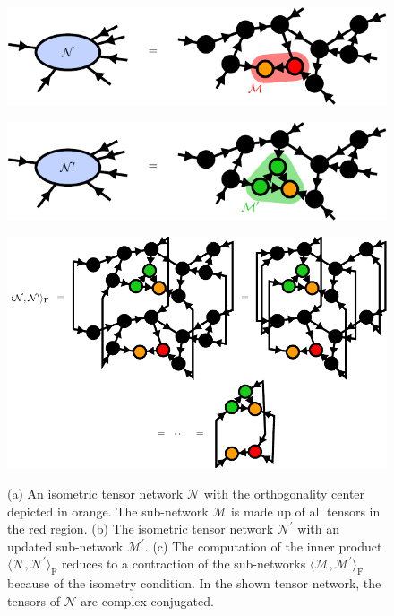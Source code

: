 \begin{figure}
	\centering
	\subcaptionbox{\label{fig:isometric_tensor_network_N}}
	{%
		\includegraphics[scale=1]{figures/tikz/Tensor_Networks/contractions_of_isometric_tensor_networks/contractions_of_isometric_tensor_networks_a.pdf}
	}
	\par\bigskip
	\subcaptionbox{\label{fig:isometric_tensor_network_N_prime}}
	{%
		\includegraphics[scale=1]{figures/tikz/Tensor_Networks/contractions_of_isometric_tensor_networks/contractions_of_isometric_tensor_networks_b.pdf}
	}
	\par\bigskip
	\subcaptionbox{\label{fig:isometric_tensor_network_norm_contraction}}
	{%
		\includegraphics[scale=1]{figures/tikz/Tensor_Networks/contractions_of_isometric_tensor_networks/contractions_of_isometric_tensor_networks_c.pdf}
	}
	\caption{(a) An isometric tensor network $\mathcal{N}$ with the orthogonality center depicted in orange. The sub-network $\mathcal{M}$ is made up of all tensors in the red region. (b) The isometric tensor network $\mathcal{N}^\prime$ with an updated sub-network $\mathcal{M}^\prime$. (c) The computation of the inner product $\langle\mathcal{N},\mathcal{N}^\prime\rangle_\text{F}$ reduces to a contraction of the sub-networks $\langle\mathcal{M},\mathcal{M}^\prime\rangle_\text{F}$ because of the isometry condition. In the shown tensor network, the tensors of $\mathcal{N}$ are complex conjugated.}
	\label{fig:isometric_tensor_network_local_approximation}
\end{figure}